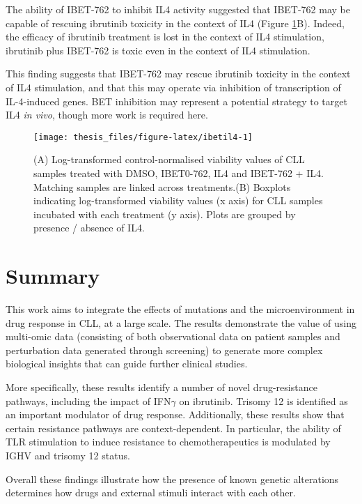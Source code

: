 \documentclass[11pt, a4paper, twosided]{book}
\begin{document}
The ability of IBET-762 to inhibit IL4 activity suggested that IBET-762 may be capable of rescuing ibrutinib toxicity in the context of IL4 (Figure \ref{fig:ibetil4}B). Indeed, the efficacy of ibrutinib treatment is lost in the context of IL4 stimulation, ibrutinib plus IBET-762 is toxic even in the context of IL4 stimulation.

This finding suggests that IBET-762 may rescue ibrutinib toxicity in the context of IL4 stimulation, and that this may operate via inhibition of transcription of IL-4-induced genes. BET inhibition may represent a potential strategy to target IL4 \emph{in vivo}, though more work is required here.


\begin{figure}

{\centering \texttt{[image: thesis\_files/figure-latex/ibetil4-1]} 

}

\caption{(A) Log-transformed control-normalised viability values of CLL samples treated with DMSO, IBET0-762, IL4 and IBET-762 + IL4. Matching samples are linked across treatments.(B) Boxplots indicating log-transformed viability values (x axis) for CLL samples incubated with each treatment (y axis). Plots are grouped by presence / absence of IL4.}\label{fig:ibetil4}
\end{figure}
\hypertarget{summary-2}{%
\section{Summary}\label{summary-2}}

This work aims to integrate the effects of mutations and the microenvironment in drug response in CLL, at a large scale. The results demonstrate the value of using multi-omic data (consisting of both observational data on patient samples and perturbation data generated through screening) to generate more complex biological insights that can guide further clinical studies.

More specifically, these results identify a number of novel drug-resistance pathways, including the impact of IFN\(\gamma\) on ibrutinib. Trisomy 12 is identified as an important modulator of drug response. Additionally, these results show that certain resistance pathways are context-dependent. In particular, the ability of TLR stimulation to induce resistance to chemotherapeutics is modulated by IGHV and trisomy 12 status.

Overall these findings illustrate how the presence of known genetic alterations determines how drugs and external stimuli interact with each other.
\end{document}
